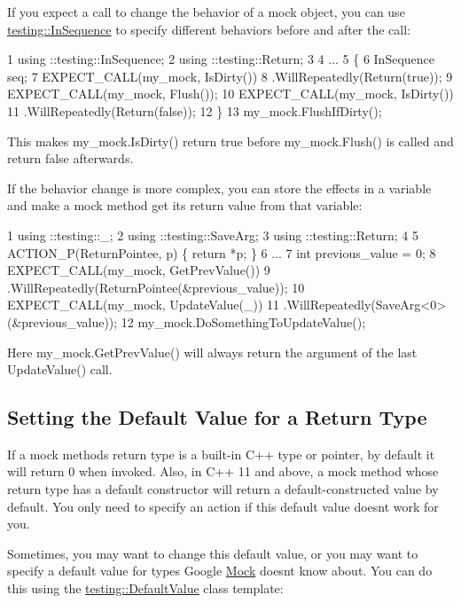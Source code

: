 If you expect a call to change the behavior of a mock object, you can use {\ttfamily \hyperlink{classtesting_1_1_in_sequence}{testing\+::\+In\+Sequence}} to specify different behaviors before and after the call\+:


\begin{DoxyCode}
1 using ::testing::InSequence;
2 using ::testing::Return;
3 
4 ...
5   \{
6     InSequence seq;
7     EXPECT\_CALL(my\_mock, IsDirty())
8         .WillRepeatedly(Return(true));
9     EXPECT\_CALL(my\_mock, Flush());
10     EXPECT\_CALL(my\_mock, IsDirty())
11         .WillRepeatedly(Return(false));
12   \}
13   my\_mock.FlushIfDirty();
\end{DoxyCode}


This makes {\ttfamily my\+\_\+mock.\+Is\+Dirty()} return {\ttfamily true} before {\ttfamily my\+\_\+mock.\+Flush()} is called and return {\ttfamily false} afterwards.

If the behavior change is more complex, you can store the effects in a variable and make a mock method get its return value from that variable\+:


\begin{DoxyCode}
1 using ::testing::\_;
2 using ::testing::SaveArg;
3 using ::testing::Return;
4 
5 ACTION\_P(ReturnPointee, p) \{ return *p; \}
6 ...
7   int previous\_value = 0;
8   EXPECT\_CALL(my\_mock, GetPrevValue())
9       .WillRepeatedly(ReturnPointee(&previous\_value));
10   EXPECT\_CALL(my\_mock, UpdateValue(\_))
11       .WillRepeatedly(SaveArg<0>(&previous\_value));
12   my\_mock.DoSomethingToUpdateValue();
\end{DoxyCode}


Here {\ttfamily my\+\_\+mock.\+Get\+Prev\+Value()} will always return the argument of the last {\ttfamily Update\+Value()} call.

\subsection*{Setting the Default Value for a Return Type}

If a mock method\textquotesingle{}s return type is a built-\/in C++ type or pointer, by default it will return 0 when invoked. Also, in C++ 11 and above, a mock method whose return type has a default constructor will return a default-\/constructed value by default. You only need to specify an action if this default value doesn\textquotesingle{}t work for you.

Sometimes, you may want to change this default value, or you may want to specify a default value for types Google \hyperlink{class_mock}{Mock} doesn\textquotesingle{}t know about. You can do this using the {\ttfamily \hyperlink{classtesting_1_1_default_value}{testing\+::\+Default\+Value}} class template\+:


